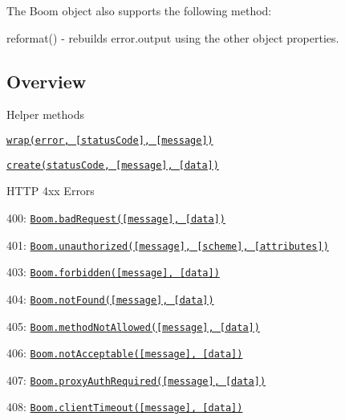 The {\ttfamily Boom} object also supports the following method\+:
\begin{DoxyItemize}
\item {\ttfamily reformat()} -\/ rebuilds {\ttfamily error.\+output} using the other object properties.
\end{DoxyItemize}

\subsection*{Overview}


\begin{DoxyItemize}
\item Helper methods
\begin{DoxyItemize}
\item \href{#wraperror-statuscode-message}{\tt {\ttfamily wrap(error, \mbox{[}status\+Code\mbox{]}, \mbox{[}message\mbox{]})}}
\item \href{#createstatuscode-message-data}{\tt {\ttfamily create(status\+Code, \mbox{[}message\mbox{]}, \mbox{[}data\mbox{]})}}
\end{DoxyItemize}
\item H\+T\+TP 4xx Errors
\begin{DoxyItemize}
\item 400\+: \href{#boombadrequestmessage-data}{\tt {\ttfamily Boom.\+bad\+Request(\mbox{[}message\mbox{]}, \mbox{[}data\mbox{]})}}
\item 401\+: \href{#boomunauthorizedmessage-scheme-attributes}{\tt {\ttfamily Boom.\+unauthorized(\mbox{[}message\mbox{]}, \mbox{[}scheme\mbox{]}, \mbox{[}attributes\mbox{]})}}
\item 403\+: \href{#boomforbiddenmessage-data}{\tt {\ttfamily Boom.\+forbidden(\mbox{[}message\mbox{]}, \mbox{[}data\mbox{]})}}
\item 404\+: \href{#boomnotfoundmessage-data}{\tt {\ttfamily Boom.\+not\+Found(\mbox{[}message\mbox{]}, \mbox{[}data\mbox{]})}}
\item 405\+: \href{#boommethodnotallowedmessage-data}{\tt {\ttfamily Boom.\+method\+Not\+Allowed(\mbox{[}message\mbox{]}, \mbox{[}data\mbox{]})}}
\item 406\+: \href{#boomnotacceptablemessage-data}{\tt {\ttfamily Boom.\+not\+Acceptable(\mbox{[}message\mbox{]}, \mbox{[}data\mbox{]})}}
\item 407\+: \href{#boomproxyauthrequiredmessage-data}{\tt {\ttfamily Boom.\+proxy\+Auth\+Required(\mbox{[}message\mbox{]}, \mbox{[}data\mbox{]})}}
\item 408\+: \href{#boomclienttimeoutmessage-data}{\tt {\ttfamily Boom.\+client\+Timeout(\mbox{[}message\mbox{]}, \mbox{[}data\mbox{]})}}

\end{DoxyItemize}
\end{DoxyItemize}
